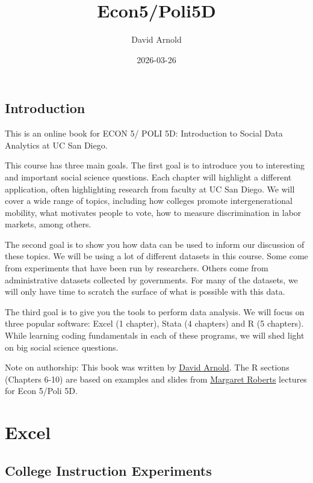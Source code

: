 \documentclass[
]{book}
\title{Econ5/Poli5D}
\author{David Arnold}
\date{2026-03-26}
\begin{document}
\maketitle

{
\setcounter{tocdepth}{1}
\tableofcontents
}
\chapter*{Introduction}\label{introduction}

This is an online book for ECON 5/ POLI 5D: Introduction to Social Data Analytics at UC San Diego.

This course has three main goals. The first goal is to introduce you to interesting and important social science questions. Each chapter will highlight a different application, often highlighting research from faculty at UC San Diego. We will cover a wide range of topics, including how colleges promote intergenerational mobility, what motivates people to vote, how to measure discrimination in labor markets, among others.

The second goal is to show you how data can be used to inform our discussion of these topics. We will be using a lot of different datasets in this course. Some come from experiments that have been run by researchers. Others come from administrative datasets collected by governments. For many of the datasets, we will only have time to scratch the surface of what is possible with this data.

The third goal is to give you the tools to perform data analysis. We will focus on three popular software: Excel (1 chapter), Stata (4 chapters) and R (5 chapters). While learning coding fundamentals in each of these programs, we will shed light on big social science questions.

Note on authorship: This book was written by \href{https://sites.google.com/site/davidhallarnold/home}{David Arnold}. The R sections (Chapters 6-10) are based on examples and slides from \href{http://www.margaretroberts.net/}{Margaret Roberts} lectures for Econ 5/Poli 5D.

\part{Excel}\label{part-excel}

\chapter{College Instruction Experiments}\label{college-instruction-experiments}
\end{document}

